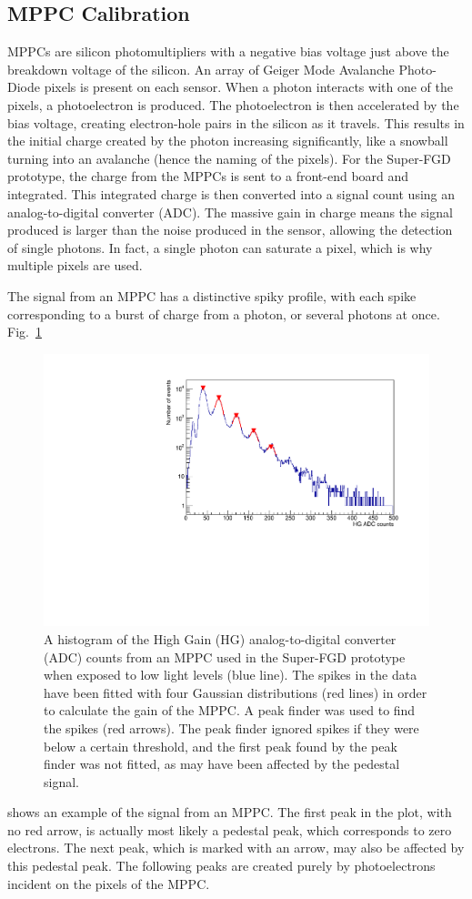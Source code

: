 \documentclass[aps,pra,12pt,notitlepage,tightenlines]{revtex4-1}
\begin{document}
\subsection{MPPC Calibration}
\label{sec:mppc}
MPPCs are silicon photomultipliers with a negative bias voltage just above the breakdown voltage of the silicon. An array of Geiger Mode Avalanche Photo-Diode pixels is present on each sensor. When a photon interacts with one of the pixels, a photoelectron is produced. The photoelectron is then accelerated by the bias voltage, creating electron-hole pairs in the silicon as it travels. This results in the initial charge created by the photon increasing significantly, like a snowball turning into an avalanche (hence the naming of the pixels). For the Super-FGD prototype, the charge from the MPPCs is sent to a front-end board and integrated. This integrated charge is then converted into a signal count using an analog-to-digital converter (ADC). The massive gain in charge means the signal produced is larger than the noise produced in the sensor, allowing the detection of single photons. In fact, a single photon can saturate a pixel, which is why multiple pixels are used.

The signal from an MPPC has a distinctive spiky profile, with each spike corresponding to a burst of charge from a photon, or several photons at once. Fig.~\ref{fig:mppc}
\begin{figure}
 \includegraphics[scale=0.7]{newMPPC}
 \caption{A histogram of the High Gain (HG) analog-to-digital converter (ADC) counts from an MPPC used in the Super-FGD prototype when exposed to low light levels (blue line). The spikes in the data have been fitted with four Gaussian distributions (red lines) in order to calculate the gain of the MPPC. A peak finder was used to find the spikes (red arrows). The peak finder ignored spikes if they were below a certain threshold, and the first peak found by the peak finder was not fitted, as may have been affected by the pedestal signal.}
 \label{fig:mppc}
\end{figure}
shows an example of the signal from an MPPC. The first peak in the plot, with no red arrow, is actually most likely a pedestal peak, which corresponds to zero electrons. The next peak, which is marked with an arrow, may also be affected by this pedestal peak. The following peaks are created purely by photoelectrons incident on the pixels of the MPPC. 
 
\end{document}
